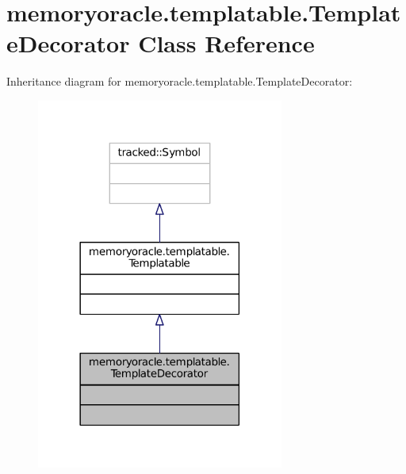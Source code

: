 \hypertarget{classmemoryoracle_1_1templatable_1_1TemplateDecorator}{}\section{memoryoracle.\+templatable.\+Template\+Decorator Class Reference}
\label{classmemoryoracle_1_1templatable_1_1TemplateDecorator}


Inheritance diagram for memoryoracle.\+templatable.\+Template\+Decorator\+:\nopagebreak
\begin{figure}[H]
\begin{center}
\leavevmode
\includegraphics[width=230pt]{classmemoryoracle_1_1templatable_1_1TemplateDecorator__inherit__graph}
\end{center}
\end{figure}


